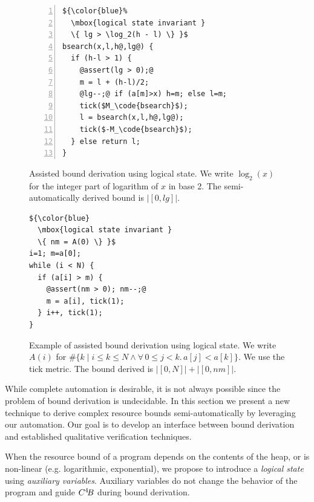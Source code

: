 \documentclass[nocopyrightspace,preprint,pldi]{sigplanconf-pldi15}
\begin{document}
\begin{figure}
\begin{lstlisting}[numbers=left]
${\color{blue}%
  \mbox{logical state invariant }
  \{ lg > \log_2(h - l) \} }$
bsearch(x,l,h@,lg@) {
  if (h-l > 1) {
    @assert(lg > 0);@
    m = l + (h-l)/2;
    @lg--;@ if (a[m]>x) h=m; else l=m;
    tick($M_\code{bsearch}$);
    l = bsearch(x,l,h@,lg@);
    tick($-M_\code{bsearch}$);
  } else return l;
}
\end{lstlisting}
\caption{Assisted bound derivation using logical state.
  We write $\log_2(x)$ for the integer part of
  logarithm of $x$ in base 2.
  The semi-automatically derived bound is $|[0,lg]|$.
  }
\label{fig:xmplbsaux}
\end{figure}

\ifdefined\fullversion
\begin{figure}
\begin{lstlisting}
${\color{blue}
  \mbox{logical state invariant }
  \{ nm = A(0) \} }$
i=1; m=a[0];
while (i < N) {
  if (a[i] > m) {
    @assert(nm > 0); nm--;@
    m = a[i], tick(1);
  } i++, tick(1);
}
\end{lstlisting}
\caption{Example of assisted bound derivation using logical state.
  We write $A(i)$ for
  $\#\{ k \mid i \le k \le N \land \forall\, 0\le j<k.\, a[j] < a[k]\}$.
  We use the tick metric.  The bound derived is $|[0,N]| + |[0,nm]|$.
  }
\label{fig:xmplmax}
\end{figure}
\fi

While complete automation is desirable, it is not always possible
since the problem of bound derivation is undecidable.  In this section
we present a new technique to derive complex resource bounds
semi-automatically by leveraging our automation. Our goal is to
develop an interface between bound derivation and
established qualitative verification techniques.

When the resource bound of a program depends on the contents of the
heap, or is non-linear (e.g. logarithmic, exponential), we propose to
introduce a \emph{logical state} using \emph{auxiliary variables}.
Auxiliary variables do not change the behavior of the program and
guide $C^4\!B$ during bound derivation.
\end{document}
